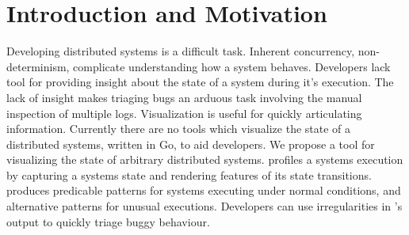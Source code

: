 \section{Introduction and Motivation}
\label{sec:intro}

Developing distributed systems is a difficult task. Inherent concurrency,
non-determinism, complicate understanding how a system behaves. Developers
lack tool for providing insight about the state of a system during it's
execution.  The lack of insight makes triaging bugs an arduous task involving
the manual inspection of multiple logs. Visualization is useful for quickly
articulating information. Currently there are no tools which visualize the
state of a distributed systems, written in Go, to aid developers. We propose \dviz a tool
for visualizing the state of arbitrary distributed systems. \dviz profiles a
systems execution by capturing a systems state and rendering features of its
state transitions. \dviz produces predicable patterns for systems executing
under normal conditions, and alternative patterns for unusual executions.
Developers can use irregularities in \dviz's output to quickly triage buggy
behaviour.
